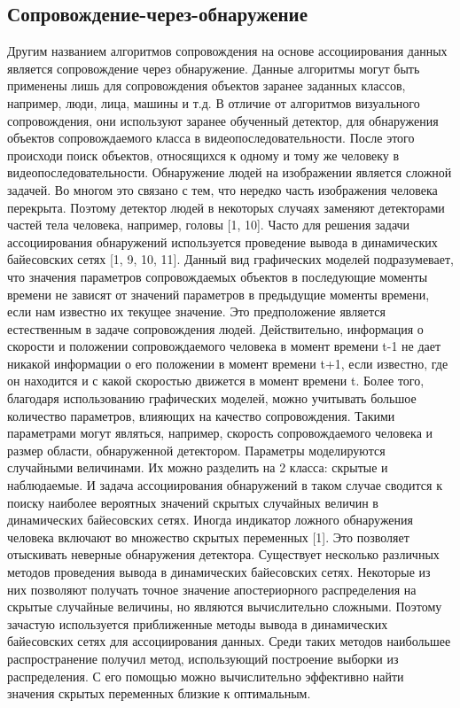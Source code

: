 \subsection{Сопровождение-через-обнаружение}

Другим названием алгоритмов сопровождения на основе ассоциирования данных является сопровождение через обнаружение. Данные алгоритмы могут быть применены лишь для сопровождения объектов заранее заданных классов, например, люди, лица, машины и т.д. В отличие от алгоритмов визуального сопровождения, они используют заранее обученный детектор, для обнаружения объектов сопровождаемого класса в видеопоследовательности. После этого происходи поиск объектов, относящихся к одному и тому же человеку в видеопоследовательности.
Обнаружение людей на изображении является сложной задачей. Во многом это связано с тем, что нередко часть изображения человека перекрыта. Поэтому детектор людей в некоторых случаях заменяют детекторами частей тела человека, например, головы [1, 10].
Часто для решения задачи ассоциирования обнаружений используется проведение вывода в динамических байесовских сетях [1, 9, 10, 11]. Данный вид графических моделей подразумевает, что значения параметров сопровождаемых объектов в последующие моменты времени не зависят от значений параметров в предыдущие моменты времени, если нам известно их текущее значение. Это предположение является естественным в задаче сопровождения людей. Действительно, информация о скорости и положении сопровождаемого человека в момент времени t-1 не дает никакой информации о его положении в момент времени t+1, если известно, где он находится и с какой скоростью движется в момент времени t.
Более того, благодаря использованию графических моделей, можно учитывать большое количество параметров, влияющих на качество сопровождения. Такими параметрами могут являться, например, скорость сопровождаемого человека и размер области, обнаруженной детектором. Параметры моделируются случайными величинами. Их можно разделить на 2 класса: скрытые и наблюдаемые. И задача ассоциирования обнаружений в таком случае сводится к поиску наиболее вероятных значений скрытых случайных величин в динамических байесовских сетях. Иногда индикатор ложного обнаружения человека включают во множество скрытых переменных [1]. Это позволяет отыскивать неверные обнаружения детектора.
Существует несколько различных методов проведения вывода в динамических байесовских сетях. Некоторые из них позволяют получать точное значение апостериорного распределения на скрытые случайные величины, но являются вычислительно сложными. Поэтому зачастую используется приближенные методы вывода в динамических байесовских сетях для ассоциирования данных. Среди таких методов наибольшее распространение получил метод, использующий построение выборки из распределения. С его помощью можно вычислительно эффективно найти значения скрытых переменных близкие к оптимальным.
